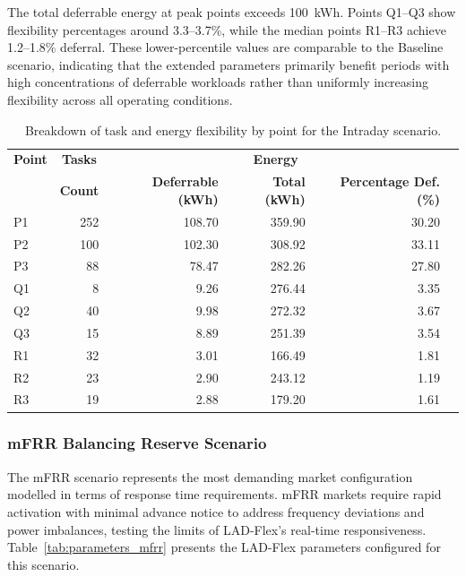 \documentclass[preprint,12pt]{elsarticle}
\begin{document}
The total deferrable energy at peak points exceeds 100~kWh. Points Q1–Q3 show flexibility percentages around 3.3–3.7\%, while the median points R1–R3 achieve 1.2–1.8\% deferral. These lower-percentile values are comparable to the Baseline scenario, indicating that the extended parameters primarily benefit periods with high concentrations of deferrable workloads rather than uniformly increasing flexibility across all operating conditions.

\begin{table}[h!]
\centering
\renewcommand{\arraystretch}{1.2}
\begin{tabular}{@{}lrr rrr@{}}
\toprule
\textbf{Point} & \multicolumn{1}{c}{\textbf{Tasks}} & \multicolumn{3}{c}{\textbf{Energy}} \\
              & \textbf{Count} & \textbf{Deferrable (kWh)} & \textbf{Total (kWh)} & \textbf{Percentage Def. (\%)} \\
\midrule
P1 & 252 & 108.70 & 359.90 & 30.20 \\
P2 & 100 & 102.30 & 308.92 & 33.11 \\
P3 & 88  & 78.47  & 282.26 & 27.80 \\
Q1 & 8   & 9.26   & 276.44 & 3.35  \\
Q2 & 40  & 9.98   & 272.32 & 3.67  \\
Q3 & 15  & 8.89   & 251.39 & 3.54  \\
R1 & 32  & 3.01   & 166.49 & 1.81  \\
R2 & 23  & 2.90   & 243.12 & 1.19  \\
R3 & 19  & 2.88   & 179.20 & 1.61  \\
\bottomrule
\end{tabular}
\caption{Breakdown of task and energy flexibility by point for the Intraday scenario.}
\label{tab:energy_flexibility_intraday}
\end{table}


\subsubsection{mFRR Balancing Reserve Scenario} \label{mfrr_scenario}

The mFRR scenario represents the most demanding market configuration modelled in terms of response time requirements. mFRR markets require rapid activation with minimal advance notice to address frequency deviations and power imbalances, testing the limits of LAD-Flex's real-time responsiveness. Table~\ref{tab:parameters_mfrr} presents the LAD-Flex parameters configured for this scenario.
\end{document}
